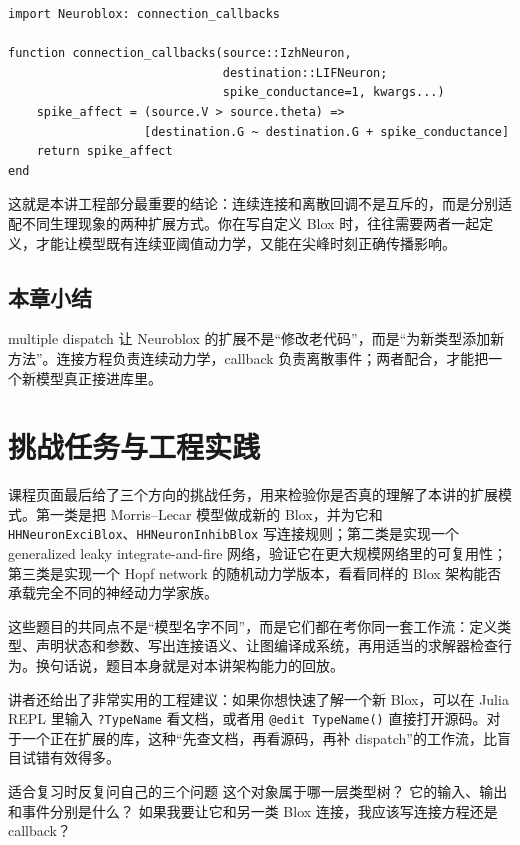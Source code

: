 \documentclass[a4paper]{article}
\begin{document}
\begin{lstlisting}[caption={用 callback 把尖峰事件映射到下游变量更新}]
import Neuroblox: connection_callbacks

function connection_callbacks(source::IzhNeuron,
                              destination::LIFNeuron;
                              spike_conductance=1, kwargs...)
    spike_affect = (source.V > source.theta) =>
                   [destination.G ~ destination.G + spike_conductance]
    return spike_affect
end
\end{lstlisting}

这就是本讲工程部分最重要的结论：连续连接和离散回调不是互斥的，而是分别适配不同生理现象的两种扩展方式。你在写自定义 Blox 时，往往需要两者一起定义，才能让模型既有连续亚阈值动力学，又能在尖峰时刻正确传播影响。

\subsection{本章小结}
multiple dispatch 让 Neuroblox 的扩展不是“修改老代码”，而是“为新类型添加新方法”。连接方程负责连续动力学，callback 负责离散事件；两者配合，才能把一个新模型真正接进库里。

\section{挑战任务与工程实践}
课程页面最后给了三个方向的挑战任务，用来检验你是否真的理解了本讲的扩展模式。第一类是把 Morris--Lecar 模型做成新的 Blox，并为它和 \texttt{HHNeuronExciBlox}、\texttt{HHNeuronInhibBlox} 写连接规则；第二类是实现一个 generalized leaky integrate-and-fire 网络，验证它在更大规模网络里的可复用性；第三类是实现一个 Hopf network 的随机动力学版本，看看同样的 Blox 架构能否承载完全不同的神经动力学家族。

这些题目的共同点不是“模型名字不同”，而是它们都在考你同一套工作流：定义类型、声明状态和参数、写出连接语义、让图编译成系统，再用适当的求解器检查行为。换句话说，题目本身就是对本讲架构能力的回放。

讲者还给出了非常实用的工程建议：如果你想快速了解一个新 Blox，可以在 Julia REPL 里输入 \texttt{?TypeName} 看文档，或者用 \texttt{@edit TypeName()} 直接打开源码。对于一个正在扩展的库，这种“先查文档，再看源码，再补 dispatch”的工作流，比盲目试错有效得多。

\begin{knowledgebox}{适合复习时反复问自己的三个问题}
这个对象属于哪一层类型树？
它的输入、输出和事件分别是什么？
如果我要让它和另一类 Blox 连接，我应该写连接方程还是 callback？
\end{knowledgebox}
\end{document}
